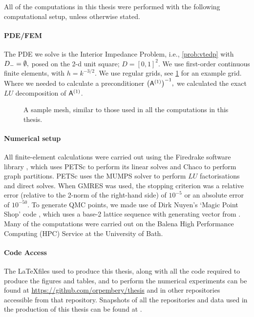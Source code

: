 All of the computations in this thesis were performed with the following computational setup, unless otherwise stated.

\paragraph{PDE/FEM}
The PDE we solve is the Interior Impedance Problem, i.e., \cref{prob:vtedp} with $D_{-} = \emptyset,$ posed on the 2-d unit square; $D = [0,1]^2.$ We use first-order continuous finite elements, with $h = k^{-3/2}$. We use regular grids, see \cref{fig:grid} for an example grid. Where we needed to calculate a preconditioner $\AmatoI,$ we calculated the exact $LU$ decomposition of $\mathsf{A}^{(1)}$.

\begin{figure}[h]
  \centering
  
  \caption{A sample mesh, similar to those used in all the computations in this thesis.\label{fig:grid}}
  \end{figure}

\paragraph{Numerical setup}
All finite-element calculations were carried out using the Firedrake software library \cite{RaHaMiLaLuMcBeMaKe:16,LuVaRaBeRaHaKe:15}, which uses PETSc to perform its linear solves \cite{BaAbAsBrBrBuDaEiGrKaKnMaMcMiMuRuSaSmZaZhZh:18,BaGrMcSm:97,DaPaKlCo:11,BaAbAdBrBrBuDaDeEiGrKaKaKnMaMcMiMuRuSaSmZaZh:19} and Chaco \cite{HeLe:95} to perform graph partitions. PETSc uses the MUMPS \cite{AmDuLEKo:01,AmGuLEPr:06} solver to perform $LU$ factorisations and direct solves. When GMRES was used, the stopping criterion was a relative error (relative to the 2-norm of the right-hand side) of $10^{-5}$ or an absolute error of $10^{-50}.$ To generate QMC points, we made use of Dirk Nuyen's `Magic Point Shop' code \cite{Nu,KuNu:16}, which uses a base-2 lattice sequence with generating vector from \cite{CoKuNu:06}. Many of the computations were carried out on the Balena High Performance Computing (HPC) Service at the University of Bath.

\paragraph{Code Access}
The \LaTeX files used to produce this thesis, along with all the code required to produce the figures and tables, and to perform the numerical experiments can be found at \url{https://github.com/orpembery/thesis} and in other repositories accessible from that repository. Snapshots of all the repositories and data used in the production of this thesis can be found at \cite{thesis-github,hhfd,hhnp,hhmc,rnbpc,rhhmc,pge,rhhmcd}.
